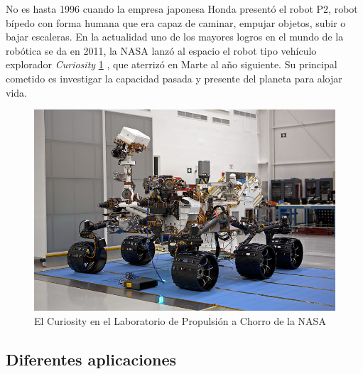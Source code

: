 No es hasta 1996 cuando la empresa japonesa Honda presentó el robot P2, robot bípedo con forma humana que era capaz de caminar, empujar objetos, subir o bajar escaleras.
En la actualidad uno de los mayores logros en el mundo de la robótica se da en 2011, la NASA lanzó al espacio el robot tipo vehículo explorador \textit{Curiosity} \ref{fig:curiosity} , que aterrizó en Marte al año siguiente. Su principal cometido es investigar la capacidad pasada y presente del planeta para alojar vida.

\begin{figure}[H]
    \centering
    \includegraphics[scale=0.95]{img/curiosity.jpg}
  	\caption{El Curiosity en el Laboratorio de Propulsión a Chorro de la NASA}
  	\label{fig:curiosity}
\end{figure}

\subsection{Diferentes aplicaciones}
\label{subsec:diferentes aplicaciones}


